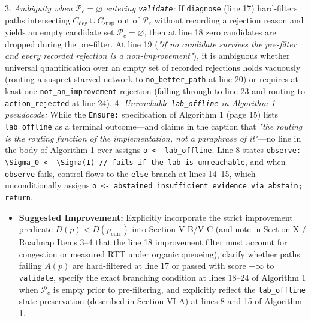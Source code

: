 \documentclass[11pt,a4paper]{article}
\begin{document}
3. \emph{Ambiguity when $\mathcal{P}_c = \varnothing$ entering \texttt{validate}:} If \texttt{diagnose} (line 17) hard-filters paths intersecting $C_{\text{deg}} \cup C_{\text{susp}}$ out of $\mathcal{P}_c$ without recording a rejection reason and yields an empty candidate set $\mathcal{P}_c = \varnothing$, then at line 18 zero candidates are dropped during the pre-filter. At line 19 (\emph{"if no candidate survives the pre-filter and every recorded rejection is a non-improvement"}), it is ambiguous whether universal quantification over an empty set of recorded rejections holds vacuously (routing a suspect-starved network to \texttt{no\_better\_path} at line 20) or requires at least one \texttt{not\_an\_improvement} rejection (falling through to line 23 and routing to \texttt{action\_rejected} at line 24).
4. \emph{Unreachable \texttt{lab\_offline} in Algorithm 1 pseudocode:} While the \texttt{Ensure:} specification of Algorithm 1 (page 15) lists \texttt{lab\_offline} as a terminal outcome—and claims in the caption that \emph{"the routing is the routing function of the implementation, not a paraphrase of it"}—no line in the body of Algorithm 1 ever assigns \texttt{o <- lab\_offline}. Line 8 states \texttt{observe: \textbackslash{}Sigma\_0 <- \textbackslash{}Sigma(I) // fails if the lab is unreachable}, and when \texttt{observe} fails, control flows to the \texttt{else} branch at lines 14–15, which unconditionally assigns \texttt{o <- abstained\_insufficient\_evidence via abstain; return}.
\begin{itemize}[leftmargin=1.8em,itemsep=2pt]
\item \textbf{Suggested Improvement:} Explicitly incorporate the strict improvement predicate $D(p) < D(p_{\text{curr}})$ into Section V-B/V-C (and note in Section X / Roadmap Items 3–4 that the line 18 improvement filter must account for congestion or measured RTT under organic queueing), clarify whether paths failing $A(p)$ are hard-filtered at line 17 or passed with score $+\infty$ to \texttt{validate}, specify the exact branching condition at lines 18–24 of Algorithm 1 when $\mathcal{P}_c$ is empty prior to pre-filtering, and explicitly reflect the \texttt{lab\_offline} state preservation (described in Section VI-A) at lines 8 and 15 of Algorithm 1.
\end{itemize}
\end{document}
